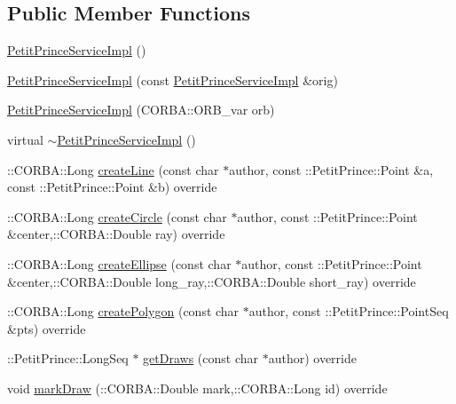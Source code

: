 \subsection*{Public Member Functions}
\begin{DoxyCompactItemize}
\item 
\hyperlink{class_petit_prince_service_impl_acb11d35aba248f3ce9ea1a2d9cd654a8}{Petit\+Prince\+Service\+Impl} ()
\item 
\hyperlink{class_petit_prince_service_impl_ac8dc71f547e35e7bb9258e295070cb57}{Petit\+Prince\+Service\+Impl} (const \hyperlink{class_petit_prince_service_impl}{Petit\+Prince\+Service\+Impl} \&orig)
\item 
\hyperlink{class_petit_prince_service_impl_a32477f50eef22f4d24f0992da6199ae8}{Petit\+Prince\+Service\+Impl} (C\+O\+R\+B\+A\+::\+O\+R\+B\+\_\+var orb)
\item 
virtual \hyperlink{class_petit_prince_service_impl_a081b125001408b7435084e78f5b72eca}{$\sim$\+Petit\+Prince\+Service\+Impl} ()
\item 
\+::C\+O\+R\+B\+A\+::\+Long \hyperlink{class_petit_prince_service_impl_a4e6bf63f7d72d5e989bf17048a599fb8}{create\+Line} (const char $\ast$author, const \+::Petit\+Prince\+::\+Point \&a, const \+::Petit\+Prince\+::\+Point \&b) override
\item 
\+::C\+O\+R\+B\+A\+::\+Long \hyperlink{class_petit_prince_service_impl_a0b7cffc9821263e6d5f02d66b1329757}{create\+Circle} (const char $\ast$author, const \+::Petit\+Prince\+::\+Point \&center,\+::C\+O\+R\+B\+A\+::\+Double ray) override
\item 
\+::C\+O\+R\+B\+A\+::\+Long \hyperlink{class_petit_prince_service_impl_a68056adee736bda1c4d418f476cebb24}{create\+Ellipse} (const char $\ast$author, const \+::Petit\+Prince\+::\+Point \&center,\+::C\+O\+R\+B\+A\+::\+Double long\+\_\+ray,\+::C\+O\+R\+B\+A\+::\+Double short\+\_\+ray) override
\item 
\+::C\+O\+R\+B\+A\+::\+Long \hyperlink{class_petit_prince_service_impl_a284536ea642e136e079eb3449fce4b9b}{create\+Polygon} (const char $\ast$author, const \+::Petit\+Prince\+::\+Point\+Seq \&pts) override
\item 
\+::Petit\+Prince\+::\+Long\+Seq $\ast$ \hyperlink{class_petit_prince_service_impl_af076444504abc06a3230f6f05c81833c}{get\+Draws} (const char $\ast$author) override
\item 
void \hyperlink{class_petit_prince_service_impl_abe85dc1a7c705dec3aeac5c56e2f9e98}{mark\+Draw} (\+::C\+O\+R\+B\+A\+::\+Double mark,\+::C\+O\+R\+B\+A\+::\+Long id) override
\end{DoxyCompactItemize}
